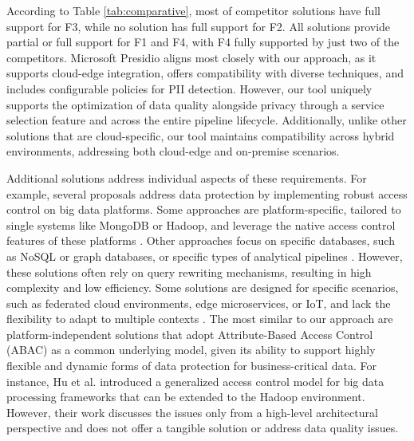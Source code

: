 {According to Table \ref{tab:comparative}, most of competitor solutions have full support for F3, while no solution has full support for F2. All solutions provide partial or full support for F1 and F4, with F4 fully supported by just two of the competitors.  Microsoft Presidio aligns most closely with our approach, as it supports cloud-edge integration, offers compatibility with diverse techniques, and includes configurable policies for PII detection. However, our tool uniquely supports the optimization of data quality alongside privacy through a service selection feature and across the entire pipeline lifecycle. Additionally, unlike other solutions that are cloud-specific, our tool maintains compatibility across hybrid environments, addressing both cloud-edge and on-premise scenarios.}

Additional solutions address individual aspects of these requirements. For example, several proposals address data protection by implementing robust access control on big data platforms. Some approaches are platform-specific, tailored to single systems like MongoDB or Hadoop, and leverage the native access control features of these platforms \cite{rathore2017hadoop,anisetti2018privacy,FederationAC:Journ:2020,Sandhu:ABAC:2018,GuptaSandu:2017}. Other approaches focus on specific databases, such as NoSQL or graph databases, or specific types of analytical pipelines \cite{AConGraphDB:2021, AConMongoDB:2022, ABACforHBase:2019}. However, these solutions often rely on query rewriting mechanisms, resulting in high complexity and low efficiency. Some solutions are designed for specific scenarios, such as federated cloud environments, edge microservices, or IoT, and lack the flexibility to adapt to multiple contexts \cite{MultipartyAC:2019, IoTSecurity}.
%
The most similar to our approach are platform-independent solutions that adopt Attribute-Based Access Control (ABAC) \cite{XACML3.0} as a common underlying model, given its ability to support highly flexible and dynamic forms of data protection for business-critical data. {\color{OurColor}For instance, Hu et al. \cite{ HUFerraiolo:2014} introduced a generalized access control model for big data processing frameworks that can be extended to the Hadoop environment. However, their work discusses the issues only from a high-level architectural perspective and does not offer a tangible solution or address data quality issues.}

